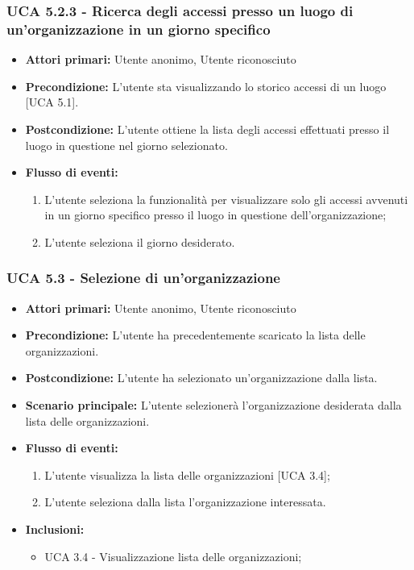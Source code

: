\subsubsection{UCA 5.2.3 - Ricerca degli accessi presso un luogo di un'organizzazione in un giorno specifico}
\begin{itemize}
    \item \textbf{Attori primari:} Utente anonimo, Utente riconosciuto
    \item \textbf{Precondizione:} L'utente sta visualizzando lo storico accessi di un luogo [UCA 5.1].
    \item \textbf{Postcondizione:} L'utente ottiene la lista degli accessi effettuati presso il luogo in questione nel giorno selezionato.
    \item \textbf{Flusso di eventi:}
    \begin{enumerate}
        \item L'utente seleziona la funzionalità per visualizzare solo gli accessi avvenuti in un giorno specifico presso il luogo in questione dell'organizzazione;
        \item L'utente seleziona il giorno desiderato.
    \end{enumerate}
\end{itemize}

\subsubsection{UCA 5.3 - Selezione di un'organizzazione}
\begin{itemize}
    \item \textbf{Attori primari:} Utente anonimo, Utente riconosciuto
    \item \textbf{Precondizione:} L'utente ha precedentemente scaricato la lista delle organizzazioni.
    \item \textbf{Postcondizione:} L'utente ha selezionato un'organizzazione dalla lista.
    \item \textbf{Scenario principale:} L'utente selezionerà l'organizzazione desiderata dalla lista delle organizzazioni.
    \item \textbf{Flusso di eventi:}
    \begin{enumerate}
        \item L'utente visualizza la lista delle organizzazioni [UCA 3.4];
        \item L'utente seleziona dalla lista l'organizzazione interessata.
    \end{enumerate}
    \item \textbf{Inclusioni:}
    \begin{itemize}
        \item UCA 3.4 - Visualizzazione lista delle organizzazioni;
    \end{itemize}
\end{itemize}